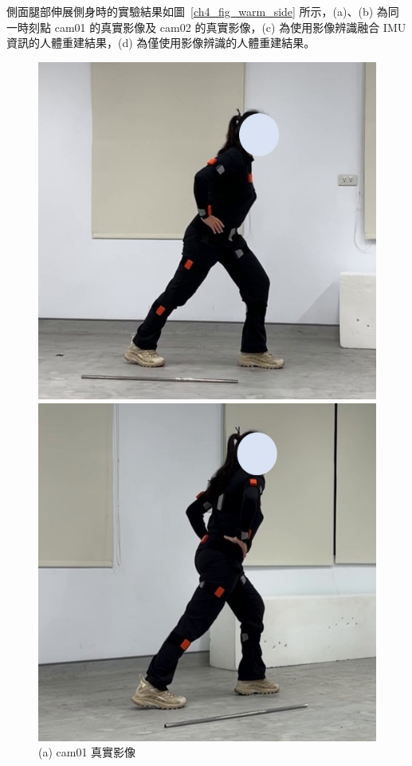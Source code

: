 \clearpage

側面腿部伸展側身時的實驗結果如圖~\ref{ch4_fig_warm_side} 所示，(a)、(b) 為同一時刻點 cam01 的真實影像及 cam02 的真實影像，(c) 為使用影像辨識融合 IMU 資訊的人體重建結果，(d) 為僅使用影像辨識的人體重建結果。

\begin{figure}[!ht]
   \centering
   \begin{minipage}{.5\textwidth}
      \centering
      \includegraphics[width=.95\linewidth]{figure/ch4_fig_warm_cam01_with2.jpg}
      \caption*{(a) cam01 真實影像}
    \end{minipage}%
    \begin{minipage}{.5\textwidth}
       \centering
       \includegraphics[width=.95\linewidth]{figure/ch4_fig_warm_cam02_with2.jpg}

\end{minipage}
\end{figure}

